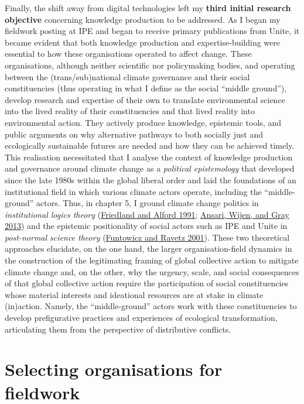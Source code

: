 \documentclass[a4paper, nobind]{templates/ociamthesis}
\begin{document}
Finally, the shift away from digital technologies left my \textbf{third initial research objective} concerning knowledge production to be addressed. As I began my fieldwork posting at IPE and began to receive primary publications from Unite, it became evident that both knowledge production and expertise-building were essential to how these organisations operated to affect change. These organisations, although neither scientific nor policymaking bodies, and operating between the (trans/sub)national climate governance and their social constituencies (thus operating in what I define as the social ``middle ground''), develop research and expertise of their own to translate environmental science into the lived reality of their constituencies and that lived reality into environmental action. They actively produce knowledge, epistemic tools, and public arguments on why alternative pathways to both socially just and ecologically sustainable futures are needed and how they can be achieved timely. This realisation necessitated that I analyse the context of knowledge production and governance around climate change as a \emph{political epistemology} that developed since the late 1980s within the global liberal order and laid the foundations of an institutional field in which various climate actors operate, including the ``middle-ground'' actors. Thus, in chapter 5, I ground climate change politics in \emph{institutional logics theory} (\protect\hyperlink{ref-friedland_bringing_1991}{Friedland and Alford 1991}; \protect\hyperlink{ref-ansari_constructing_2013}{Ansari, Wijen, and Gray 2013}) and the epistemic positionality of social actors such as IPE and Unite in \emph{post-normal science theory} (\protect\hyperlink{ref-funtowicz_post-normal_2001}{Funtowicz and Ravetz 2001}). These two theoretical approaches elucidate, on the one hand, the larger organisation-field dynamics in the construction of the legitimating framing of global collective action to mitigate climate change and, on the other, why the urgency, scale, and social consequences of that global collective action require the participation of social constituencies whose material interests and ideational resources are at stake in climate (in)action. Namely, the ``middle-ground'' actors work with these constituencies to develop prefigurative practices and experiences of ecological transformation, articulating them from the perspective of distributive conflicts.

\hypertarget{selecting-organisations-for-fieldwork}{%
\section{Selecting organisations for fieldwork}\label{selecting-organisations-for-fieldwork}}
\end{document}
